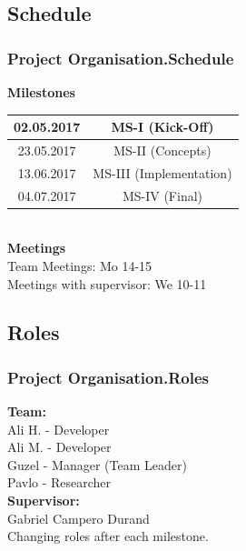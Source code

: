 \documentclass{beamer}
\begin{document}
\subsection{Schedule}
\begin{frame}
\frametitle{Project Organisation.Schedule}
\textbf{Milestones} \\
\vspace{0.5 cm}
\begin{tabular}{|c|c|}
\hline 
02.05.2017 & MS-I (Kick-Off) \\ 
\hline 
23.05.2017 & MS-II (Concepts) \\ 
\hline 
13.06.2017 & MS-III (Implementation) \\ 
\hline 
04.07.2017 & MS-IV (Final) \\ 
\hline 
\end{tabular}
\\ \vspace{0.5 cm}
\textbf{Meetings} \\ 
\vspace{0.5 cm}
\hspace{0.5 cm} Team Meetings: Mo 14-15 \\
\hspace{0.5 cm} Meetings with supervisor: We 10-11

\end{frame}

\subsection{Roles}
\begin{frame}
\frametitle{Project Organisation.Roles}

\textbf{Team:} \\
\hspace{0.3 cm}Ali H. - Developer\\
\hspace{0.3 cm}Ali M. - Developer\\
\hspace{0.3 cm}Guzel - Manager (Team Leader)\\
\hspace{0.3 cm}Pavlo - Researcher\\

\vspace{0.2 cm}
\textbf{Supervisor:} \\
\hspace{0.3 cm} Gabriel Campero Durand \\

\vspace{0.2 cm}
Changing roles after each milestone.

\end{frame}
\end{document}
